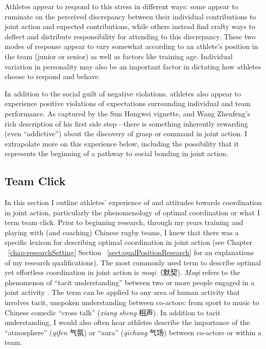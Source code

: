 \begin{CJK}{UTF8}{gbsn}
Athletes appear to respond to this stress in different ways: some appear to ruminate on the perceived discrepancy between their individual contributions to joint action and expected contributions, while others instead find crafty ways to deflect and distribute responsibility for attending to this discrepancy.  These two modes of response appear to vary somewhat according to an athlete's position in the team (junior or senior) as well as factors like training age.  Individual variation in personality may also be an important factor in dictating how athletes choose to respond and behave.

In addition to the social guilt of negative violations, athletes also appear to experience positive violations of expectations surrounding individual and team performance.  As captured by the Sun Hongwei vignette, and Wang Zhenfeng's rich description of his first side step---there is something inherently rewarding (even ``addictive'') about the discovery of grasp or command in joint action.  I extrapolate more on this experience below, including the possibility that it represents the beginning of a pathway to social bonding in joint action.



\clearpage
\subsection{Team Click\label{sect:teamClick}}
In this section I outline athletes' experience of and attitudes towards coordination in joint action, particularly the phenomenology of optimal coordination or what I term team click.  Prior to beginning research, through my years training and playing with (and coaching) Chinese rugby teams, I knew that there was a specific lexicon for describing optimal coordination in joint action (see Chapter ~\ref{chap:researchSetting} Section ~\ref{sect:qualPositionResearch} for an explanations of my research qualifications).  The most commonly used term to describe optimal yet effortless coordination in joint action is \textit{moqi}（默契). \textit{Moqi} refers to the phenomenon of ``tacit understanding'' between two or more people engaged in a joint activity \citep{Pleco2018}. The term can be applied to any area of human activity that involves tacit, unspoken understanding between co-actors: from sport to music to Chinese comedic ``cross talk'' (\textit{xiang sheng} 相声).  In addition to tacit understanding, I would also often hear athletes describe the importance of the ``atmosphere'' (\textit{qifen} 气氛) or ``aura'' (\textit{qichang} 气场) between co-actors or within a team.


\end{CJK}
